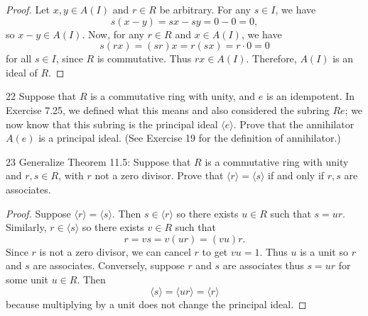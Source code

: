 \begin{proof}
    Let $x, y \in A(I)$ and $r \in R$ be arbitrary.  
    For any $s \in I$, we have
    \[
        s(x - y) = sx - sy = 0 - 0 = 0,
    \]
    so $x - y \in A(I)$.  
    Now, for any $r \in R$ and $x \in A(I)$, we have
    \[
        s(rx) = (sr)x = r(sx) = r \cdot 0 = 0
    \]
    for all $s \in I$, since $R$ is commutative.  
    Thus $rx \in A(I)$.  
    Therefore, $A(I)$ is an ideal of $R$.
\end{proof}

\begin{problem}{22}
    Suppose that $R$ is a commutative ring with unity, and $e$ is an idempotent. In
    Exercise 7.25, we defined what this means and also considered the subring $Re$; we
    now know that this subring is the principal ideal $\langle e \rangle$. Prove that the
    annihilator $A(e)$ is a principal ideal. (See Exercise 19 for the definition of
    annihilator.)
\end{problem}
\unsolved

\begin{problem}{23}
    Generalize Theorem 11.5: Suppose that $R$ is a commutative ring with unity and $r, s \in R$,
    with $r$ not a zero divisor. Prove that $\langle r \rangle = \langle s \rangle$ if and only if $r, s$ are associates.
\end{problem}
\solved

\begin{proof}
    Suppose $\langle r \rangle = \langle s \rangle$.  
    Then $s \in \langle r \rangle$ so there exists $u \in R$ such that $s = u r$.
    Similarly, $r \in \langle s \rangle$ so there exists $v \in R$ such that 
    \[
        r = v s = v (u r) = (v u) r.
    \]  
    Since $r$ is not a zero divisor, we can cancel $r$ to get $v u = 1$.  
    Thus $u$ is a unit so $r$ and $s$ are associates.  
    Conversely, suppose $r$ and $s$ are associates thus $s = u r$ for some unit $u \in R$.  
    Then 
    \[
        \langle s \rangle = \langle u r \rangle = \langle r \rangle
    \]  
    because multiplying by a unit does not change the principal ideal.  
\end{proof}
